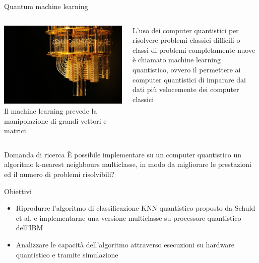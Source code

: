\documentclass{beamer}
\begin{document}
    \begin{frame}{Quantum machine learning}
        \begin{columns}
            \includegraphics[width=\textwidth]{gfx/quantum-computer.jpg}
            Il machine learning prevede la manipolazione di grandi vettori e matrici.

            \vspace{1cm}

            L'uso dei computer quantistici per risolvere problemi classici difficili o classi di problemi completamente nuove è chiamato machine learning quantistico, 
            ovvero il permettere ai computer quantistici di imparare dai dati più velocemente dei computer classici
        \end{columns}
    \end{frame}

    \begin{frame}{Domanda di ricerca}
        È possibile implementare su un computer quantistico un 
        algoritmo k-nearest neighbours multiclasse, in modo da 
        migliorare le prestazioni ed il numero di problemi risolvibili? 
    \end{frame}

    \begin{frame}{Obiettivi}
        \begin{itemize}
            \item Riprodurre l'algoritmo di classificazione KNN quantistico proposto da Schuld et al. \cite{schuld} e implementarne una versione multiclasse su processore quantistico dell'IBM
            \item Analizzare le capacità dell'algoritmo attraverso esecuzioni su hardware quantistico e tramite simulazione
        \end{itemize}
    \end{frame}
\end{document}
